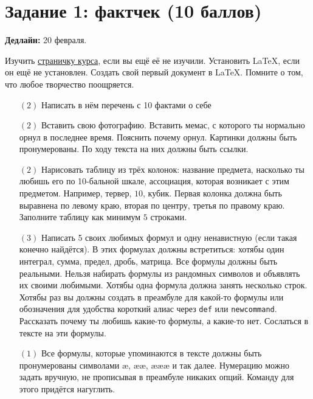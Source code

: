 \documentclass[12pt, a4paper, oneside]{article}
\begin{document}
\section*{Задание 1: фактчек  (10 баллов)}

\textbf{Дедлайн:} 20 февраля. 

Изучить \href{https://fulyankin.github.io/LaTeX/}{страничку курса}, если вы ещё её не изучили. Установить LaTeX, если он ещё не установлен. Создать свой первый документ в LaTeX. Помните о том, что любое творчество поощряется. 


\begin{itemize}

\item [$(2)$] Написать в нём перечень с 10 фактами о себе

\item[$(2)$] Вставить свою фотографию.  Вставить мемас, с которого ты нормально орнул в последнее время. Пояснить почему орнул. Картинки должны быть пронумерованы. По ходу текста на них должны быть ссылки. 

\item[$(2)$] Нарисовать таблицу из трёх колонок: название предмета, насколько ты любишь его по 10-бальной шкале, ассоциация, которая возникает с этим предметом. Например, тервер, $10$, кубик. Первая колонка должна быть выравнена по левому краю, вторая по центру, третья по правому краю. Заполните таблицу как минимум $5$ строками.

\item[$(3)$] Написать 5 своих любимых формул и одну ненавистную (если такая конечно найдётся). В этих формулах должны встретиться: хотябы один интеграл, сумма, предел, дробь, матрица. Все формулы должны быть реальными. Нельзя набирать формулы из рандомных символов и объявлять их своими любимыми. Хотябы одна формула должна занять несколько строк.  Хотябы раз вы должны создать в преамбуле для какой-то формулы или обозначения для удобства короткий алиас через \texttt{def} или \texttt{newcommand}. Рассказать почему ты любишь какие-то формулы, а какие-то нет. Сослаться в тексте на эти формулы. 


\item[$(1)$] Все формулы, которые упоминаются в тексте должны быть пронумерованы символами æ, ææ, æææ и так далее. Нумерацию можно задать вручную, не прописывая в преамбуле никаких опций. Команду для этого придётся нагуглить. 
\end{itemize}
\end{document}
